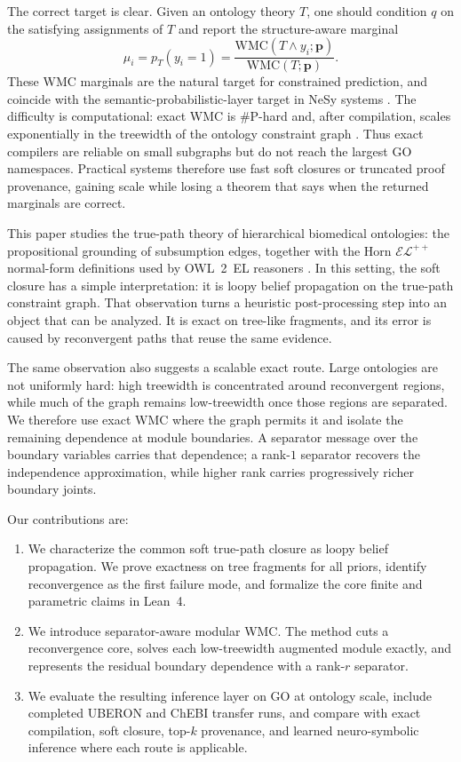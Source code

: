 \documentclass[letterpaper]{article}
\newcommand{\WMC}{\ensuremath{\mathrm{WMC}}}
\newcommand{\bC}[1]{\boldsymbol{#1}}
\begin{document}
The correct target is clear. Given an ontology theory $T$, one should condition $q$ on the satisfying assignments of $T$ and report the structure-aware marginal
\[
\mu_i = p_T(y_i{=}1)=\frac{\WMC(T\wedge y_i;\bC p)}{\WMC(T;\bC p)}.
\]
These WMC marginals are the natural target for constrained prediction, and coincide with the semantic-probabilistic-layer target in NeSy systems \citep{xu2018semanticloss,ahmed2022spl}. The difficulty is computational: exact WMC is $\#$P-hard and, after compilation, scales exponentially in the treewidth of the ontology constraint graph \citep{chavira2008wmc,darwiche2011sdd,bodlaender1993treewidth}. Thus exact compilers are reliable on small subgraphs but do not reach the largest GO namespaces. Practical systems therefore use fast soft closures or truncated proof provenance, gaining scale while losing a theorem that says when the returned marginals are correct.

This paper studies the true-path theory of hierarchical biomedical ontologies: the propositional grounding of subsumption edges, together with the Horn $\mathcal{EL}^{++}$ normal-form definitions used by OWL~2~EL reasoners \citep{baader2005elenvelope,kazakov2014elk}. In this setting, the soft closure has a simple interpretation: it is loopy belief propagation on the true-path constraint graph. That observation turns a heuristic post-processing step into an object that can be analyzed. It is exact on tree-like fragments, and its error is caused by reconvergent paths that reuse the same evidence.

The same observation also suggests a scalable exact route. Large ontologies are not uniformly hard: high treewidth is concentrated around reconvergent regions, while much of the graph remains low-treewidth once those regions are separated. We therefore use exact WMC where the graph permits it and isolate the remaining dependence at module boundaries. A separator message over the boundary variables carries that dependence; a rank-$1$ separator recovers the independence approximation, while higher rank carries progressively richer boundary joints.

Our contributions are:
\begin{enumerate}
\item We characterize the common soft true-path closure as loopy belief propagation. We prove exactness on tree fragments for all priors, identify reconvergence as the first failure mode, and formalize the core finite and parametric claims in Lean~4.
\item We introduce separator-aware modular WMC. The method cuts a reconvergence core, solves each low-treewidth augmented module exactly, and represents the residual boundary dependence with a rank-$r$ separator.
\item We evaluate the resulting inference layer on GO at ontology scale, include completed UBERON and ChEBI transfer runs, and compare with exact compilation, soft closure, top-$k$ provenance, and learned neuro-symbolic inference where each route is applicable.
\end{enumerate}
\end{document}

